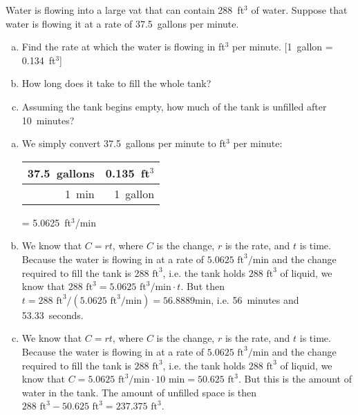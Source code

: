 \documentclass[11pt,letterpaper]{article}
\begin{document}

 Water is flowing into a large vat that can contain 288~ft$^3$ of water. Suppose that water is flowing it at a rate of 37.5~gallons per minute. 
	\begin{enumerate}[(a)]
	\item Find the rate at which the water is flowing in ft$^3$ per minute. [1~gallon = 0.134~ft$^3$]
	\item How long does it take to fill the whole tank?
	\item Assuming the tank begins empty, how much of the tank is unfilled after 10~minutes?
	\end{enumerate} \pspace

\sol
\begin{enumerate}[(a)]
\item We simply convert 37.5~gallons per minute to ft$^3$ per minute: \par
	\begin{table}[!ht]
	\centering
	\begin{tabular}{r|r}
	37.5~gallons & 0.135~ft$^3$ \\ \hline
	1~min	     & 1~gallon
	\end{tabular}
	= 5.0625~ft$^3$/min
	\end{table} \pspace
 
\item We know that $C= rt$, where $C$ is the change, $r$ is the rate, and $t$ is time. Because the water is flowing in at a rate of $5.0625 \text{ ft}^3/\text{min}$ and the change required to fill the tank is $288 \text{ ft}^3$, i.e. the tank holds $288 \text{ ft}^3$ of liquid, we know that $288 \text{ ft}^3= 5.0625 \text{ ft}^3/\text{min} \cdot t$. But then $t= 288 \text{ ft}^3/(5.0625 \text{ ft}^3/\text{min})= 56.8889 \text{min}$, i.e. 56~minutes and 53.33~seconds. \pspace
 
\item We know that $C= rt$, where $C$ is the change, $r$ is the rate, and $t$ is time. Because the water is flowing in at a rate of $5.0625 \text{ ft}^3/\text{min}$ and the change required to fill the tank is $288 \text{ ft}^3$, i.e. the tank holds $288 \text{ ft}^3$ of liquid, we know that $C= 5.0625 \text{ ft}^3/\text{min} \cdot 10 \text{ min}= 50.625 \text{ ft}^3$. But this is the amount of water in the tank. The amount of unfilled space is then $288 \text{ ft}^3 - 50.625 \text{ ft}^3= 237.375 \text{ ft}^3$. \pspace 
\end{enumerate}
\end{document}
